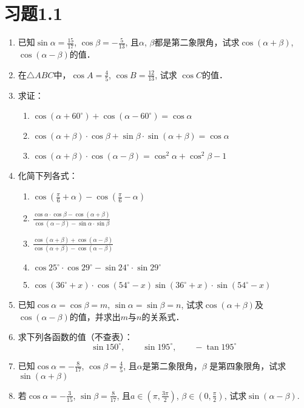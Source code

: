 \section*{习题1.1}
\begin{enumerate}
\item 已知$\sin\alpha=\frac{15}{17}$, $\cos\beta=-\frac{5}{13}$, 且$\alpha$, $\beta$都是第二象限角，试求$\cos(\alpha+\beta)$, $\cos(\alpha-\beta)$的值．
\item 在$\triangle ABC$中，$\cos A=\frac{4}{5}$, $\cos B=\frac{12}{13}$, 试求 $\cos C$的值．
\item 求证：
\begin{enumerate}
    \item $\cos (\alpha+60^{\circ}) +\cos (\alpha-60^{\circ}) =\cos\alpha$
    \item $\cos (\alpha+\beta)\cdot \cos\beta+\sin\beta\cdot \sin(\alpha+\beta) =\cos\alpha$
    \item $\cos (\alpha+\beta)\cdot \cos (\alpha-\beta) =\cos^2\alpha+\cos^2\beta-1$
\end{enumerate}
\item 化简下列各式：
\begin{enumerate}
    \item $\cos\left(\frac{\pi}{6}+\alpha\right)-\cos\left(\frac{\pi}{6}-\alpha\right)$
    \item $\frac{\cos\alpha\cdot \cos\beta-\cos (\alpha+\beta)}{\cos (\alpha-\beta)-\sin\alpha\cdot \sin\beta}$
    \item $\frac{\cos (\alpha+\beta)+\cos(\alpha-\beta)}{\cos (\alpha+\beta)-\cos (\alpha-\beta)}$
    \item $\cos25^{\circ}\cdot \cos29^{\circ}-\sin24^{\circ}\cdot \sin29^{\circ}$
    \item $\cos (36^{\circ}+x)\cdot \cos (54^{\circ}-x)\sin (36^{\circ}+x)\cdot \sin (54^{\circ}-x)$
\end{enumerate} 

\item 已知$\cos\alpha=\cos\beta=m$, $\sin\alpha=\sin\beta=n$, 试求$\cos(\alpha+\beta)$及$\cos(\alpha-\beta)$的值，并求出$m$与$n$的关系式．
\item 求下列各函数的值（不查表）：
\[\sin150^{\circ},\qquad \sin195^{\circ},\qquad -\tan 195^{\circ}\]
\item 已知$\cos\alpha=-\frac{8}{17}$, $\cos\beta=\frac{4}{5}$,
且$\alpha$是第二象限角，$\beta$
是第四象限角，试求$\sin(\alpha+\beta)$

\item 若$\cos\alpha=-\frac{3}{15}$, $\sin\beta=\frac{8}{17}$, 且$a\in\left(\pi,\frac{3\pi}{2}\right)$,
$\beta\in \left(0,\frac{\pi}{2}\right)$, 试求$\sin(\alpha-\beta)$.



\end{enumerate}
